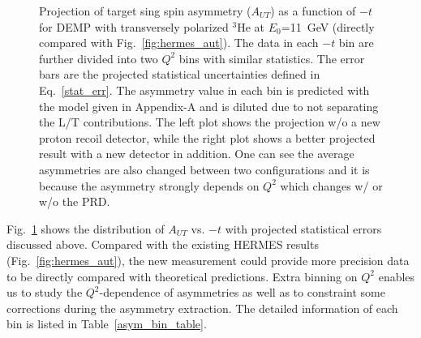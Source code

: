 \begin{figure}[!ht]
 \begin{center}
      \caption{\footnotesize{Projection of target sing spin asymmetry
          ($A_{UT}$) as a function of $-t$ for DEMP with transversely polarized
          $\mathrm{^{3}He}$ at $E_{0}$=11~GeV (directly compared with
Fig.~\ref{fig:hermes_aut}).  The data in each $-t$ bin are further divided into
two $Q^{2}$ bins with similar statistics.  The error bars are the projected
statistical uncertainties defined in Eq.~\ref{stat_err}. The asymmetry value in
each bin is predicted with the model given in Appendix-A and is diluted due to
not separating the L/T contributions. The left plot shows the projection w/o a
new proton recoil detector, while the right plot shows a better projected
result with a new detector in addition. One can see the average asymmetries are
also changed between two configurations and it is because the asymmetry
strongly depends on $Q^{2}$ which changes w/ or w/o the PRD.}}
  \label{asym_t}
  \end{center}
\end{figure}

Fig.~\ref{asym_t} shows the distribution of $A_{UT}$ vs. $-t$ with projected
statistical errors discussed above. Compared with the existing HERMES results
(Fig.~\ref{fig:hermes_aut}), the new measurement could provide more precision
data to be directly compared with theoretical predictions. Extra binning on
$Q^{2}$ enables us to study the $Q^{2}$-dependence of asymmetries as well as to
constraint some corrections during the asymmetry extraction.  The detailed
information of each bin is listed in Table~\ref{asym_bin_table}.

